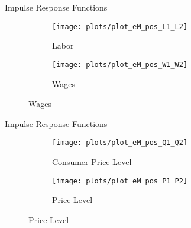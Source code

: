 \documentclass[../quali_slides.tex]{subfiles}
\begin{document}

\begin{frame}{Impulse Response Functions}
	
	\begin{figure}[h!]
		\centering
		\begin{subfigure}[b]{0.45\textwidth}
			\centering
			\texttt{[image: plots/plot\_eM\_pos\_L1\_L2]}
			\caption{\scriptsize Labor}
			\label{fig:plot_eM_pos_L1_L2}
		\end{subfigure}
		\hspace*{0.3cm}
		\begin{subfigure}[b]{0.45\textwidth}
			\centering
			\texttt{[image: plots/plot\_eM\_pos\_W1\_W2]}
			\caption{\scriptsize Wages}
			\label{fig:plot_eM_pos_W1_W2}
		\end{subfigure}
	\end{figure}
	
\end{frame}


\begin{frame}{Impulse Response Functions}
	
	\begin{figure}[h!]
		\centering
		\begin{subfigure}[b]{0.45\textwidth}
			\centering
			\texttt{[image: plots/plot\_eM\_pos\_Q1\_Q2]}
			\caption{\scriptsize Consumer Price Level}
			\label{fig:plot_eM_pos_Q1_Q2}
		\end{subfigure}
		\hspace*{0.3cm}
		\begin{subfigure}[b]{0.45\textwidth}
			\centering
			\texttt{[image: plots/plot\_eM\_pos\_P1\_P2]}
			\caption{\scriptsize Price Level}
			\label{fig:plot_eM_pos_P1_P2}
		\end{subfigure}
	\end{figure}
	
\end{frame}
\end{document}
